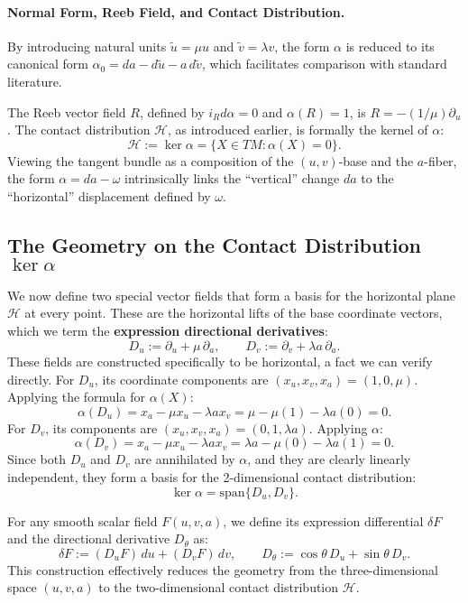 \paragraph{Normal Form, Reeb Field, and Contact Distribution.}
By introducing natural units $\tilde{u} = \mu u$ and $\tilde{v} = \lambda v$, the form $\alpha$ is reduced to its canonical form $\alpha_0 = da - d\tilde{u} - a\,d\tilde{v}$, which facilitates comparison with standard literature.

The Reeb vector field $R$, defined by $i_R d\alpha = 0$ and $\alpha(R) = 1$, is $R = -(1/\mu)\partial_u$. The contact distribution $\mathcal{H}$, as introduced earlier, is formally the kernel of $\alpha$:
\[
\mathcal{H} := \ker\alpha = \{X \in TM : \alpha(X) = 0\}.
\]
Viewing the tangent bundle as a composition of the $(u,v)$-base and the $a$-fiber, the form $\alpha = da - \omega$ intrinsically links the ``vertical'' change $da$ to the ``horizontal'' displacement defined by $\omega$.

\subsection{The Geometry on the Contact Distribution \texorpdfstring{$\ker\alpha$}{ker(alpha)}} %
\label{subsec:geometry_on_ker_alpha}

We now define two special vector fields that form a basis for the horizontal plane $\mathcal{H}$ at every point. These are the horizontal lifts of the base coordinate vectors, which we term the \textbf{expression directional derivatives}:
\begin{equation}\label{eq:directional_derivatives}
D_u := \partial_u + \mu\,\partial_a, \qquad D_v := \partial_v + \lambda a\,\partial_a.
\end{equation}
These fields are constructed specifically to be horizontal, a fact we can verify directly. For $D_u$, its coordinate components are $(x_u, x_v, x_a) = (1, 0, \mu)$. Applying the formula for $\alpha(X)$:
\[
\alpha(D_u) = x_a - \mu x_u - \lambda a x_v = \mu - \mu(1) - \lambda a(0) = 0.
\]
For $D_v$, its components are $(x_u, x_v, x_a) = (0, 1, \lambda a)$. Applying $\alpha$:
\[
\alpha(D_v) = x_a - \mu x_u - \lambda a x_v = \lambda a - \mu(0) - \lambda a(1) = 0.
\]
Since both $D_u$ and $D_v$ are annihilated by $\alpha$, and they are clearly linearly independent, they form a basis for the 2-dimensional contact distribution:
\[
\ker\alpha = \text{span}\{D_u, D_v\}.
\]

For any smooth scalar field $F(u,v,a)$, we define its expression differential $\delta F$ and the directional derivative $D_\theta$ as:
\begin{equation}\label{eq:3}\tag{3}
\delta F := (D_uF)\,du + (D_vF)\,dv, \qquad D_\theta := \cos\theta\,D_u + \sin\theta\,D_v.
\end{equation}
This construction effectively reduces the geometry from the three-dimensional space $(u,v,a)$ to the two-dimensional contact distribution $\mathcal{H}$.

